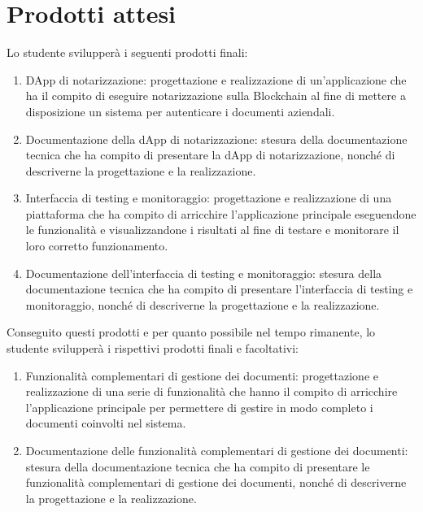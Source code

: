 \section*{Prodotti attesi}
Lo studente svilupperà i seguenti prodotti finali:
\begin{enumerate}
    \item DApp di notarizzazione: progettazione e realizzazione di un'applicazione che ha il compito di eseguire notarizzazione sulla Blockchain al fine di mettere a disposizione un sistema per autenticare i documenti aziendali. 
    
    \item Documentazione della dApp di notarizzazione: stesura della documentazione tecnica che ha compito di presentare la dApp di notarizzazione, nonché di descriverne la progettazione e la realizzazione.

    \item Interfaccia di testing e monitoraggio: progettazione e realizzazione di una piattaforma che ha compito di arricchire l'applicazione principale eseguendone le funzionalità e visualizzandone i risultati al fine di testare e monitorare il loro corretto funzionamento.
    
    \item Documentazione dell'interfaccia di testing e monitoraggio: stesura della documentazione tecnica che ha compito di presentare l'interfaccia di testing e monitoraggio, nonché di descriverne la progettazione e la realizzazione.
\end{enumerate}

Conseguito questi prodotti e per quanto possibile nel tempo rimanente, lo studente svilupperà i rispettivi prodotti finali e facoltativi:

\newpage

\begin{enumerate}
    \item Funzionalità complementari di gestione dei documenti: progettazione e realizzazione di una serie di funzionalità che hanno il compito di arricchire l'applicazione principale per permettere di gestire in modo completo i documenti coinvolti nel sistema.
    
    \item Documentazione delle funzionalità complementari di gestione dei documenti: stesura della documentazione tecnica che ha compito di presentare le funzionalità complementari di gestione dei documenti, nonché di descriverne la progettazione e la realizzazione.
\end{enumerate}